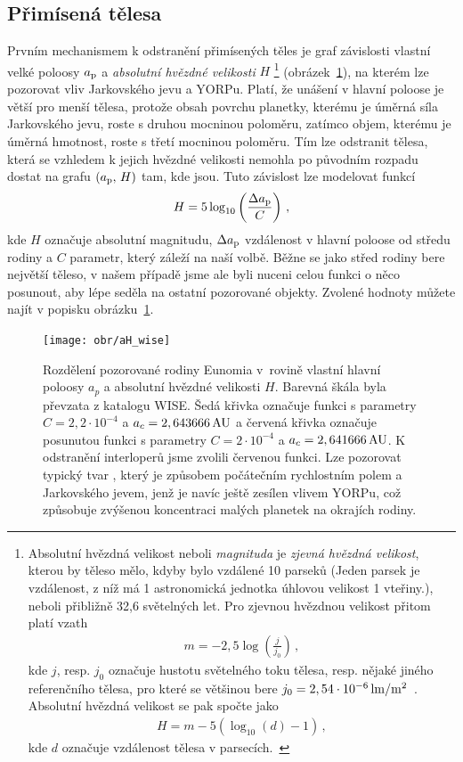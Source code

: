\documentclass[A4paper, 12pt, oneside]{book}
\begin{document}
\subsection{Přimísená tělesa} \label{sec:interlopers}

Prvním mechanismem k odstranění přimísených těles je graf závislosti vlastní velké poloosy $a_{\rm p}$ a \textit{absolutní hvězdné velikosti} $H$ \footnote{Absolutní hvězdná velikost neboli \textit{magnituda} je \textit{zjevná hvězdná velikost}, kterou by těleso mělo, kdyby bylo vzdálené 10 parseků (Jeden parsek je vzdálenost, z níž má 1 astronomická jednotka úhlovou velikost 1 vteřiny.), neboli přibližně 32,6 světelných let. Pro zjevnou hvězdnou velikost přitom platí vzath
\begin{align*}
	m=-2,5\log\left(\frac{j}{j_0}\right)\,,
\end{align*}
kde $j$, resp. $j_0$ označuje hustotu světelného toku tělesa, resp. nějaké jiného referenčního tělesa, pro které se většinou bere $j_0=2,54\cdot10^{-6}\,{\rm lm/m^2}$~\cite{fmt}. Absolutní hvězdná velikost se pak spočte jako
\begin{align*}
	H=m-5(\log_{10}(d)-1)\,,
\end{align*}
kde $d$ označuje vzdálenost tělesa v parsecích.~\cite{wiki:absmag}} 
(obrázek~\ref{fig:aH_wise}), na kterém lze pozorovat vliv Jarkovského jevu a YORPu. Platí, že unášení v hlavní poloose je větší pro menší tělesa, protože obsah povrchu planetky, kterému je úměrná síla Jarkovského jevu, roste s druhou mocninou poloměru, zatímco objem, kterému je úměrná hmotnost, roste s třetí mocninou poloměru. Tím lze odstranit tělesa, která se vzhledem k jejich hvězdné velikosti nemohla po původním rozpadu dostat na grafu $(a_{\rm p},\,H)$ tam, kde jsou. Tuto závislost lze modelovat funkcí 
\begin{align}
	H=5\log_{10}\left(\frac{\Delta a_{\rm p}}{C}\right)\,,
\end{align}
kde $H$ označuje absolutní magnitudu, $\Delta a_{\rm p}$ vzdálenost v hlavní poloose od středu rodiny a $C$ parametr, který záleží na naší volbě. Běžne se jako střed rodiny bere největší těleso, v našem případě jsme ale byli nuceni celou funkci o něco posunout, aby lépe seděla na ostatní pozorované objekty. Zvolené hodnoty můžete najít v popisku obrázku~\ref{fig:aH_wise}.
\begin{figure}
	\centering
	\texttt{[image: obr/aH\_wise]}
	\caption{Rozdělení pozorované rodiny Eunomia v~rovině vlastní hlavní poloosy $a_p$ a absolutní hvězdné velikosti $H$. Barevná škála byla převzata z katalogu WISE. Šedá křivka označuje funkci s parametry ${C=2,2\cdot10^{-4}}$ a ${a_c=2,643666\,{\rm AU}}$ a červená křivka označuje posunutou funkci s parametry ${C=2\cdot10^{-4}}$ a ${a_c=2,641666\,{\rm AU}}$. K odstranění interloperů jsme zvolili červenou funkci. Lze pozorovat typický tvar , který je způsobem počátečním rychlostním polem a Jarkovského jevem, jenž je navíc ještě zesílen vlivem YORPu, což způsobuje zvýšenou koncentraci malých planetek na okrajích rodiny.}
	\label{fig:aH_wise}
\end{figure}
\end{document}
